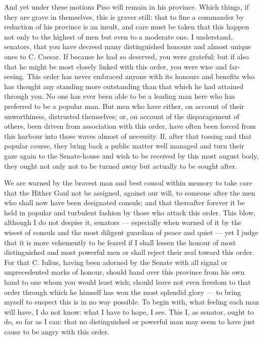  And yet under these motions Piso will remain in his province. Which things, if they are grave in themselves, this is graver still: that to fine a commander by reduction of his province is an insult, and care must be taken that this happen not only to the highest of men but even to a moderate one. I understand, senators, that you have decreed many distinguished honours and almost unique ones to C. Caesar. If because he had so deserved, you were grateful; but if also that he might be most closely linked with this order, you were wise and far-seeing. This order has never embraced anyone with its honours and benefits who has thought any standing more outstanding than that which he had attained through you. No one has ever been able to be a leading man here who has preferred to be a popular man. But men who have either, on account of their unworthiness, distrusted themselves; or, on account of the disparagement of others, been driven from association with this order, have often been forced from this harbour into those waves almost of necessity. If, after that tossing and that popular course, they bring back a public matter well managed and turn their gaze again to the Senate-house and wish to be received by this most august body, they ought not only not to be turned away but actually to be sought after.

 We are warned by the bravest man and best consul within memory to take care that the Hither Gaul not be assigned, against our will, to someone after the men who shall now have been designated consuls; and that thereafter forever it be held in popular and turbulent fashion by those who attack this order. This blow, although I do not despise it, senators --- especially when warned of it by the wisest of consuls and the most diligent guardian of peace and quiet --- yet I judge that it is more vehemently to be feared if I shall lessen the honour of most distinguished and most powerful men or shall reject their zeal toward this order. For that C. Iulius, having been adorned by the Senate with all signal or unprecedented marks of honour, should hand over this province from his own hand to one whom you would least wish; should leave not even freedom to that order through which he himself has won the most splendid glory --- to bring myself to suspect this is in no way possible. To begin with, what feeling each man will have, I do not know: what I have to hope, I see. This I, as senator, ought to do, so far as I can: that no distinguished or powerful man may seem to have just cause to be angry with this order.

